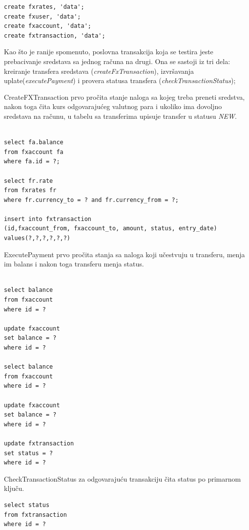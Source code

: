\documentclass[12pt,oneside]{memoir}
\begin{document}
\begin{lstlisting}[title={setup-hbase-model.sh},captionpos=t]
create fxrates, 'data';
create fxuser, 'data';
create fxaccount, 'data';
create fxtransaction, 'data';
\end{lstlisting}

Kao što je ranije spomenuto, poslovna transakcija koja se testira jeste prebacivanje sredstava sa jednog računa na drugi.  Ona se sastoji iz tri dela: kreiranje transfera sredstava (\textit{createFxTransaction}), izvršavanja uplate(\textit{executePayment}) i provera 
statusa transfera (\textit{checkTransactionStatus});

CreateFXTransaction prvo pročita stanje naloga sa kojeg treba preneti sredstva, nakon toga čita kurs odgovarajućeg valutnog para i ukoliko ima dovoljno sredstava na računu, u tabelu sa transferima upisuje transfer u statusu \textit{NEW}.

\pagebreak

\begin{lstlisting}[title={CreateFXTransaction},captionpos=t]

select fa.balance
from fxaccount fa
where fa.id = ?;

select fr.rate
from fxrates fr
where fr.currency_to = ? and fr.currency_from = ?;

insert into fxtransaction
(id,fxaccount_from, fxaccount_to, amount, status, entry_date)
values(?,?,?,?,?,?)
\end{lstlisting}

ExecutePayment prvo pročita stanja sa naloga koji učestvuju u transferu, menja im balans i nakon toga transferu menja status.

\begin{lstlisting}[title={ExecutePayment},captionpos=t]

select balance
from fxaccount
where id = ?

update fxaccount
set balance = ?
where id = ?

select balance
from fxaccount
where id = ?

update fxaccount
set balance = ?
where id = ?

update fxtransaction
set status = ?
where id = ?

\end{lstlisting}

CheckTransactionStatus za odgovarajuću transakciju čita status po primarnom ključu.


\begin{lstlisting}[title={CheckTransactionStatus},captionpos=t]
select status
from fxtransaction
where id = ?
\end{lstlisting}
\end{document}
